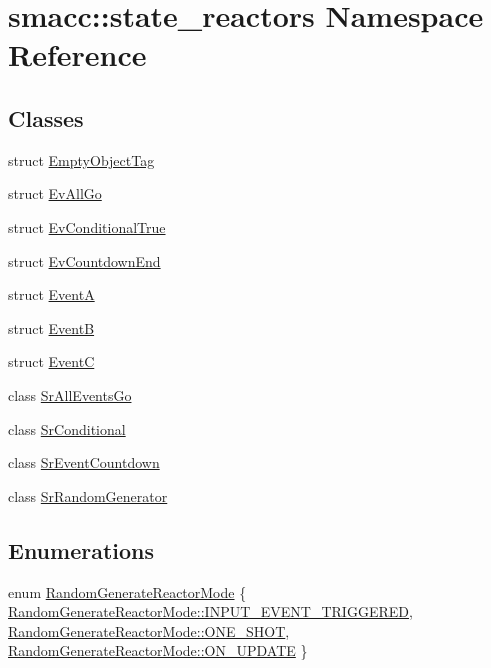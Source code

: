 \hypertarget{namespacesmacc_1_1state__reactors}{}\section{smacc\+:\+:state\+\_\+reactors Namespace Reference}
\label{namespacesmacc_1_1state__reactors}
\subsection*{Classes}
\begin{DoxyCompactItemize}
\item 
struct \hyperlink{structsmacc_1_1state__reactors_1_1EmptyObjectTag}{Empty\+Object\+Tag}
\item 
struct \hyperlink{structsmacc_1_1state__reactors_1_1EvAllGo}{Ev\+All\+Go}
\item 
struct \hyperlink{structsmacc_1_1state__reactors_1_1EvConditionalTrue}{Ev\+Conditional\+True}
\item 
struct \hyperlink{structsmacc_1_1state__reactors_1_1EvCountdownEnd}{Ev\+Countdown\+End}
\item 
struct \hyperlink{structsmacc_1_1state__reactors_1_1EventA}{EventA}
\item 
struct \hyperlink{structsmacc_1_1state__reactors_1_1EventB}{EventB}
\item 
struct \hyperlink{structsmacc_1_1state__reactors_1_1EventC}{EventC}
\item 
class \hyperlink{classsmacc_1_1state__reactors_1_1SrAllEventsGo}{Sr\+All\+Events\+Go}
\item 
class \hyperlink{classsmacc_1_1state__reactors_1_1SrConditional}{Sr\+Conditional}
\item 
class \hyperlink{classsmacc_1_1state__reactors_1_1SrEventCountdown}{Sr\+Event\+Countdown}
\item 
class \hyperlink{classsmacc_1_1state__reactors_1_1SrRandomGenerator}{Sr\+Random\+Generator}
\end{DoxyCompactItemize}
\subsection*{Enumerations}
\begin{DoxyCompactItemize}
\item 
enum \hyperlink{namespacesmacc_1_1state__reactors_a038f8e362ad6d35494c940ee4c97a52e}{Random\+Generate\+Reactor\+Mode} \{ \hyperlink{namespacesmacc_1_1state__reactors_a038f8e362ad6d35494c940ee4c97a52eab75323a08fc093fa69e7a6aceb681611}{Random\+Generate\+Reactor\+Mode\+::\+I\+N\+P\+U\+T\+\_\+\+E\+V\+E\+N\+T\+\_\+\+T\+R\+I\+G\+G\+E\+R\+ED}, 
\hyperlink{namespacesmacc_1_1state__reactors_a038f8e362ad6d35494c940ee4c97a52ea5bc2964599423c796ecf0aaecdc5be9d}{Random\+Generate\+Reactor\+Mode\+::\+O\+N\+E\+\_\+\+S\+H\+OT}, 
\hyperlink{namespacesmacc_1_1state__reactors_a038f8e362ad6d35494c940ee4c97a52ea4a6be4c8602d150038b100a35556d3d7}{Random\+Generate\+Reactor\+Mode\+::\+O\+N\+\_\+\+U\+P\+D\+A\+TE}
 \}
\end{DoxyCompactItemize}


